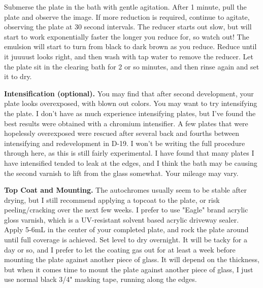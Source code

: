 \documentclass[11pt]{article}
\begin{document}
Submerse the plate in the bath with gentle agitation. After 1 minute, pull the plate and observe the image. If more reduction is required, continue to agitate, observing the plate at 30 second intervals. The reducer starts out slow, but will start to work exponentially faster the longer you reduce for, so watch out! The emulsion will start to turn from black to dark brown as you reduce. Reduce until it juuuust looks right, and then wash with tap water to remove the reducer. Let the plate sit in the clearing bath for 2 or so minutes, and then rinse again and set it to dry.\newline


\textbf{Intensification (optional).} You may find that after second development, your plate looks overexposed, with blown out colors. You may want to try intensifying the plate. I don't have as much experience intensifying plates, but I've found the best results were obtained with a chromium intensifier. A few plates that were hopelessly overexposed were rescued after several back and fourths between intensifying and redevelopment in D-19. I won't be writing the full procedure through here, as this is still fairly experimental. I have found that many plates I have intensified tended to leak at the edges, and I think the bath may be causing the second varnish to lift from the glass somewhat. Your mileage may vary.\newline

\textbf{Top Coat and Mounting.} The autochromes usually seem to be stable after drying, but I still recommend applying a topcoat to the plate, or risk peeling/cracking over the next few weeks. I prefer to use "Eagle" brand acrylic gloss varnish, which is a UV-resistant solvent based acrylic driveway sealer. Apply 5-6mL in the center of your completed plate, and rock the plate around until full coverage is achieved. Set level to dry overnight. It will be tacky for a day or so, and I prefer to let the coating gas out for at least a week before mounting the plate against another piece of glass. It will depend on the thickness, but when it comes time to mount the plate against another piece of glass, I just use normal black 3/4" masking tape, running along the edges.\newline
\end{document}
